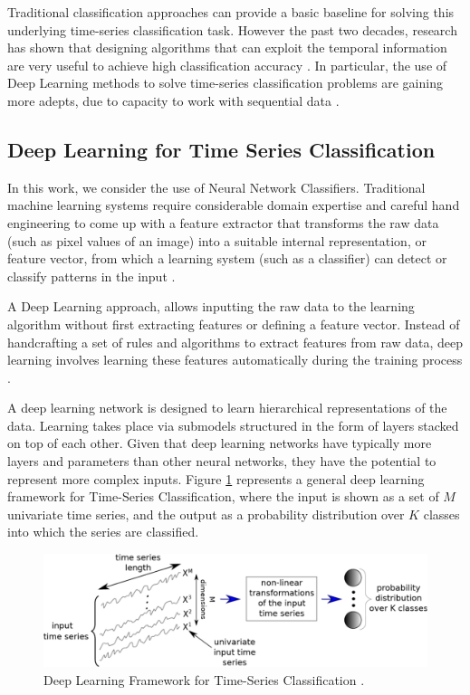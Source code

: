 Traditional classification approaches can provide a basic baseline for solving this underlying time-series classification task. However the past two decades, research has shown that designing algorithms that can exploit the temporal information are very useful to achieve high classification accuracy \cite{Wang2017}. In particular, the use of Deep Learning methods to solve time-series classification problems are gaining more adepts, due to capacity to work with sequential data \cite{Bagnall2017a, Zhao2017, Zebik2017}.

\subsection{Deep Learning for Time Series Classification}
\label{Sec:DL-TSC}
In this work, we consider the use of Neural Network Classifiers. Traditional machine learning systems require considerable domain expertise and careful hand engineering to come up with a feature extractor that transforms the raw data (such as pixel values of an image) into a suitable internal representation, or feature vector, from which a learning system (such as a classifier) can detect or classify patterns in the input \cite{Guyon2006}. 

A Deep Learning approach, allows inputting the raw data to the learning algorithm without first extracting features or defining a feature vector. Instead of handcrafting a set of rules and algorithms to extract features from raw data, deep learning involves learning these features automatically during the training process \cite{Goodfellow2016, Schmidhuber2015}. 

A deep learning network is designed to learn hierarchical representations of the data. Learning takes place via submodels structured in the form of layers stacked on top of each other. Given that deep learning networks have typically more layers and parameters than other neural networks, they have the potential to represent more complex inputs. Figure \ref{Fig:TSC-Fawaz} represents a general deep learning framework for Time-Series Classification, where the input is shown as a set of $M$ univariate time series, and the output as a probability distribution over $K$ classes into which the series are classified.

\begin{figure}[htb]
 	\centering
 	\includegraphics[scale=0.5]{../Figures/TSC_Fawaz}
 	\caption{Deep Learning Framework for Time-Series Classification \cite{Fawaz2019}.}
 	\label{Fig:TSC-Fawaz}
\end{figure}

